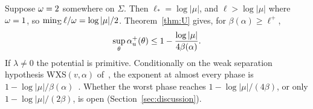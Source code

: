 Suppose $\omega=2$ somewhere on $\Sigma$. Then $\ell_*=\log|\mu|$, and $\ell>\log|\mu|$ where $\omega=1$, so $\min_\Sigma\ell/\omega=\log|\mu|/2$. Theorem~\ref{thm:U} gives, for $\beta(\alpha)\ge\ell^+$,
\[
\sup_\theta\alpha_u^+(\theta)\le1-\frac{\log|\mu|}{4\beta(\alpha)}.
\]
If $\lambda\ne0$ the potential is primitive. Conditionally on the weak separation hypothesis WXS$(v,\alpha)$ of~\cite[Definition~7.1]{DMuniv}, the exponent at almost every phase is $1-\log|\mu|/\beta(\alpha)$~\cite[Theorem~D]{DMuniv}. Whether the worst phase reaches $1-\log|\mu|/(4\beta)$, or only $1-\log|\mu|/(2\beta)$, is open (Section~\ref{sec:discussion}).
